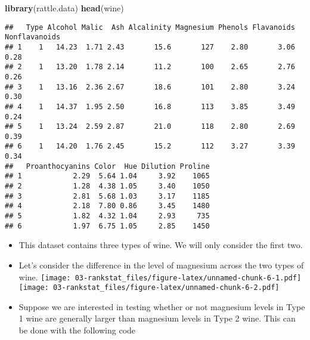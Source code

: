 \documentclass[]{book}
\newenvironment{Shaded}{\begin{snugshade}}{\end{snugshade}}
\newcommand{\DecValTok}[1]{\textcolor[rgb]{0.00,0.00,0.81}{#1}}
\newcommand{\KeywordTok}[1]{\textcolor[rgb]{0.13,0.29,0.53}{\textbf{#1}}}
\newcommand{\NormalTok}[1]{#1}
\newcommand{\OperatorTok}[1]{\textcolor[rgb]{0.81,0.36,0.00}{\textbf{#1}}}
\newcommand{\StringTok}[1]{\textcolor[rgb]{0.31,0.60,0.02}{#1}}
\providecommand{\tightlist}{%
  \setlength{\itemsep}{0pt}\setlength{\parskip}{0pt}}
\begin{document}
\begin{Shaded}
\begin{Highlighting}[]
\KeywordTok{library}\NormalTok{(rattle.data)}
\KeywordTok{head}\NormalTok{(wine)}
\end{Highlighting}
\end{Shaded}

\begin{verbatim}
##   Type Alcohol Malic  Ash Alcalinity Magnesium Phenols Flavanoids Nonflavanoids
## 1    1   14.23  1.71 2.43       15.6       127    2.80       3.06          0.28
## 2    1   13.20  1.78 2.14       11.2       100    2.65       2.76          0.26
## 3    1   13.16  2.36 2.67       18.6       101    2.80       3.24          0.30
## 4    1   14.37  1.95 2.50       16.8       113    3.85       3.49          0.24
## 5    1   13.24  2.59 2.87       21.0       118    2.80       2.69          0.39
## 6    1   14.20  1.76 2.45       15.2       112    3.27       3.39          0.34
##   Proanthocyanins Color  Hue Dilution Proline
## 1            2.29  5.64 1.04     3.92    1065
## 2            1.28  4.38 1.05     3.40    1050
## 3            2.81  5.68 1.03     3.17    1185
## 4            2.18  7.80 0.86     3.45    1480
## 5            1.82  4.32 1.04     2.93     735
## 6            1.97  6.75 1.05     2.85    1450
\end{verbatim}

\begin{itemize}
\tightlist
\item
  This dataset contains three types of wine. We will only consider the first two.
\end{itemize}

\begin{Shaded}
\end{Shaded}

\begin{itemize}
\item
  Let's consider the difference in the level of magnesium across the two types of wine.
  \texttt{[image: 03-rankstat\_files/figure-latex/unnamed-chunk-6-1.pdf]} \texttt{[image: 03-rankstat\_files/figure-latex/unnamed-chunk-6-2.pdf]}
\item
  Suppose we are interested in testing whether or not magnesium levels in
  Type 1 wine are generally larger than magnesium levels in Type 2 wine.
  This can be done with the following code
\end{itemize}
\end{document}
